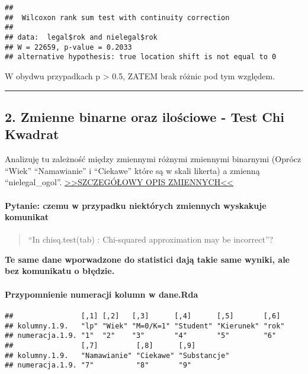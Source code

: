 \documentclass[]{article}
\let\oldparagraph\paragraph
\renewcommand{\paragraph}[1]{\oldparagraph{#1}\mbox{}}
\begin{document}
\begin{verbatim}
## 
##  Wilcoxon rank sum test with continuity correction
## 
## data:  legal$rok and nielegal$rok
## W = 22659, p-value = 0.2033
## alternative hypothesis: true location shift is not equal to 0
\end{verbatim}

W obydwu przypadkach p \textgreater{} 0.5, ZATEM brak różnic pod tym
względem.

\begin{center}\rule{0.5\linewidth}{\linethickness}\end{center}

\subsection{2. Zmienne binarne oraz ilościowe - Test Chi
Kwadrat}\label{zmienne-binarne-oraz-ilosciowe---test-chi-kwadrat}

Analizuję tu zależność między zmiennymi różnymi zmiennymi binarnymi
(Oprócz ``Wiek'' ``Namawianie'' i ``Ciekawe'' które są w skali likerta)
a zmienną ``nielegal\_ogol''.
\href{http://htmlpreview.github.io/?https://github.com/zdanowski/Ankieta_substancje_psychoaktywne/blob/master/OPIS_ZMIENNYCH.html}{\textgreater{}\textgreater{}SZCZEGÓŁOWY
OPIS ZMIENNYCH\textless{}\textless{}}

\paragraph{\texorpdfstring{\textbf{Pytanie}: czemu w przypadku
niektórych zmiennych wyskakuje
komunikat}{Pytanie: czemu w przypadku niektórych zmiennych wyskakuje komunikat}}\label{pytanie-czemu-w-przypadku-niektorych-zmiennych-wyskakuje-komunikat}

\begin{quote}
``In chisq.test(tab) : Chi-squared approximation may be incorrect''?
\end{quote}

\textbf{Te same dane wporwadzone do statistici dają takie same wyniki,
ale bez komunikatu o błędzie.}

\paragraph{Przypomnienie numeracji kolumn w
dane.Rda}\label{przypomnienie-numeracji-kolumn-w-dane.rda}

\begin{verbatim}
##                [,1] [,2]   [,3]      [,4]      [,5]       [,6] 
## kolumny.1.9.   "lp" "Wiek" "M=0/K=1" "Student" "Kierunek" "rok"
## numeracja.1.9. "1"  "2"    "3"       "4"       "5"        "6"  
##                [,7]         [,8]      [,9]        
## kolumny.1.9.   "Namawianie" "Ciekawe" "Substancje"
## numeracja.1.9. "7"          "8"       "9"
\end{verbatim}
\end{document}
